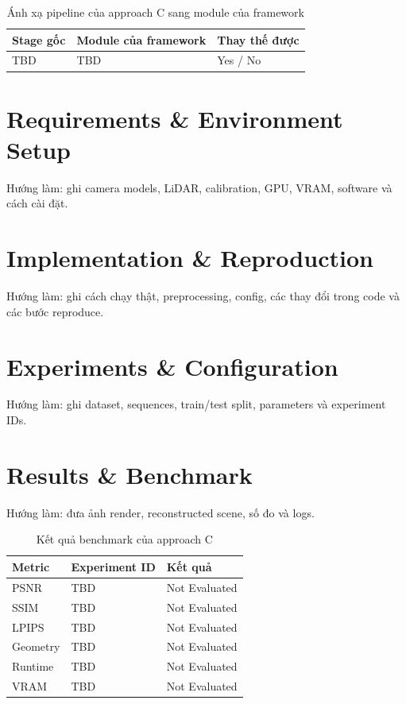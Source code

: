 \begin{table}[H]
  \centering
  \caption{Ánh xạ pipeline của approach C sang module của framework}
  \begin{tabularx}{\linewidth}{X X l}
    \toprule
    \textbf{Stage gốc} & \textbf{Module của framework} & \textbf{Thay thế được} \\
    \midrule
    TBD & TBD & Yes / No \\
    \bottomrule
  \end{tabularx}
\end{table}

\section{Requirements \& Environment Setup}

Hướng làm: ghi camera models, LiDAR, calibration, GPU, VRAM, software và cách cài đặt.

\section{Implementation \& Reproduction}

Hướng làm: ghi cách chạy thật, preprocessing, config, các thay đổi trong code và các bước reproduce.

\section{Experiments \& Configuration}

Hướng làm: ghi dataset, sequences, train/test split, parameters và experiment IDs.

\section{Results \& Benchmark}

Hướng làm: đưa ảnh render, reconstructed scene, số đo và logs.

\begin{table}[H]
  \centering
  \caption{Kết quả benchmark của approach C}
  \begin{tabularx}{\linewidth}{X l l}
    \toprule
    \textbf{Metric} & \textbf{Experiment ID} & \textbf{Kết quả} \\
    \midrule
    PSNR & TBD & Not Evaluated \\
    SSIM & TBD & Not Evaluated \\
    LPIPS & TBD & Not Evaluated \\
    Geometry & TBD & Not Evaluated \\
    Runtime & TBD & Not Evaluated \\
    VRAM & TBD & Not Evaluated \\
    \bottomrule
  \end{tabularx}
\end{table}

